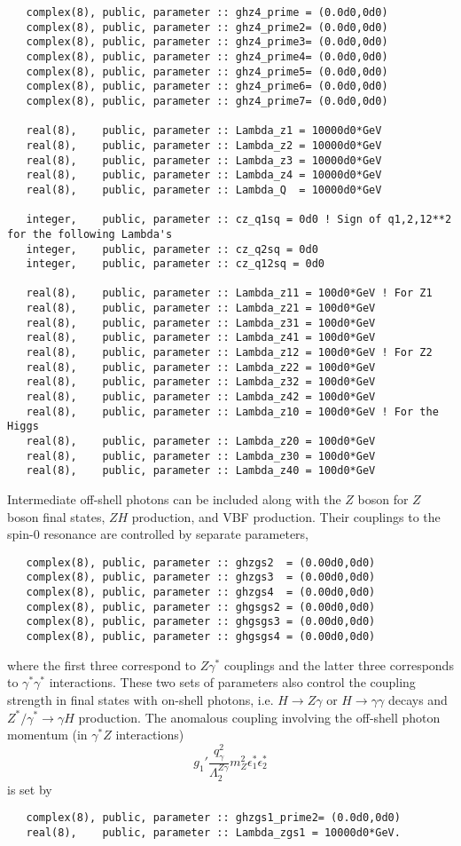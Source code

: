 \documentclass[aps,superscriptaddress,nofootinbib]{revtex4}
\begin{document}
\begin{verbatim}
   complex(8), public, parameter :: ghz4_prime = (0.0d0,0d0)
   complex(8), public, parameter :: ghz4_prime2= (0.0d0,0d0)
   complex(8), public, parameter :: ghz4_prime3= (0.0d0,0d0)
   complex(8), public, parameter :: ghz4_prime4= (0.0d0,0d0)
   complex(8), public, parameter :: ghz4_prime5= (0.0d0,0d0)
   complex(8), public, parameter :: ghz4_prime6= (0.0d0,0d0)
   complex(8), public, parameter :: ghz4_prime7= (0.0d0,0d0)

   real(8),    public, parameter :: Lambda_z1 = 10000d0*GeV
   real(8),    public, parameter :: Lambda_z2 = 10000d0*GeV
   real(8),    public, parameter :: Lambda_z3 = 10000d0*GeV
   real(8),    public, parameter :: Lambda_z4 = 10000d0*GeV
   real(8),    public, parameter :: Lambda_Q  = 10000d0*GeV
   
   integer,    public, parameter :: cz_q1sq = 0d0 ! Sign of q1,2,12**2 for the following Lambda's
   integer,    public, parameter :: cz_q2sq = 0d0
   integer,    public, parameter :: cz_q12sq = 0d0
   
   real(8),    public, parameter :: Lambda_z11 = 100d0*GeV ! For Z1
   real(8),    public, parameter :: Lambda_z21 = 100d0*GeV
   real(8),    public, parameter :: Lambda_z31 = 100d0*GeV
   real(8),    public, parameter :: Lambda_z41 = 100d0*GeV
   real(8),    public, parameter :: Lambda_z12 = 100d0*GeV ! For Z2
   real(8),    public, parameter :: Lambda_z22 = 100d0*GeV
   real(8),    public, parameter :: Lambda_z32 = 100d0*GeV
   real(8),    public, parameter :: Lambda_z42 = 100d0*GeV
   real(8),    public, parameter :: Lambda_z10 = 100d0*GeV ! For the Higgs
   real(8),    public, parameter :: Lambda_z20 = 100d0*GeV
   real(8),    public, parameter :: Lambda_z30 = 100d0*GeV
   real(8),    public, parameter :: Lambda_z40 = 100d0*GeV         
\end{verbatim}

Intermediate off-shell photons can be included along with the $Z$ boson for $Z$ boson final states, $ZH$ production, and VBF production.
Their couplings to the spin-0 resonance are controlled by separate parameters,
\begin{verbatim}
   complex(8), public, parameter :: ghzgs2  = (0.00d0,0d0)
   complex(8), public, parameter :: ghzgs3  = (0.00d0,0d0)
   complex(8), public, parameter :: ghzgs4  = (0.00d0,0d0)
   complex(8), public, parameter :: ghgsgs2 = (0.00d0,0d0)
   complex(8), public, parameter :: ghgsgs3 = (0.00d0,0d0)
   complex(8), public, parameter :: ghgsgs4 = (0.00d0,0d0)
\end{verbatim}
where the first three correspond to $Z\gamma^*$ couplings and the latter three corresponds to $\gamma^* \gamma^*$ interactions.
These two sets of parameters also control the coupling strength in final states with on-shell photons, i.e. $H\to Z\gamma$ or $H\to \gamma\gamma$ decays and $Z^*/\gamma^*\to\gamma H$ production.
The anomalous coupling involving the off-shell photon momentum (in $\gamma^* Z$ interactions)
\[
g_1' \frac{ q^2_\gamma }{ \Lambda_2^{Z\gamma} } m_Z^2 \epsilon^*_1 \epsilon^*_2
\]
is set by
\begin{verbatim}
   complex(8), public, parameter :: ghzgs1_prime2= (0.0d0,0d0)
   real(8),    public, parameter :: Lambda_zgs1 = 10000d0*GeV.
\end{verbatim}
\end{document}
